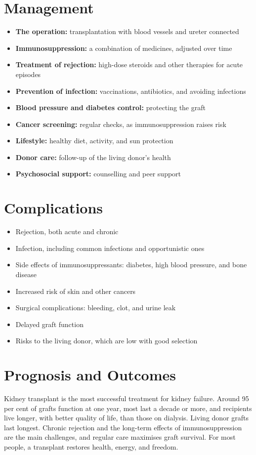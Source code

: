 \section*{Management}
\begin{itemize}
    \item \textbf{The operation:} transplantation with blood vessels and ureter connected
    \item \textbf{Immunosuppression:} a combination of medicines, adjusted over time
    \item \textbf{Treatment of rejection:} high-dose steroids and other therapies for acute episodes
    \item \textbf{Prevention of infection:} vaccinations, antibiotics, and avoiding infections
    \item \textbf{Blood pressure and diabetes control:} protecting the graft
    \item \textbf{Cancer screening:} regular checks, as immunosuppression raises risk
    \item \textbf{Lifestyle:} healthy diet, activity, and sun protection
    \item \textbf{Donor care:} follow-up of the living donor's health
    \item \textbf{Psychosocial support:} counselling and peer support
\end{itemize}

\section*{Complications}
\begin{itemize}
    \item Rejection, both acute and chronic
    \item Infection, including common infections and opportunistic ones
    \item Side effects of immunosuppressants: diabetes, high blood pressure, and bone disease
    \item Increased risk of skin and other cancers
    \item Surgical complications: bleeding, clot, and urine leak
    \item Delayed graft function
    \item Risks to the living donor, which are low with good selection
\end{itemize}

\section*{Prognosis and Outcomes}
Kidney transplant is the most successful treatment for kidney failure. Around 95 per cent of grafts function at one year, most last a decade or more, and recipients live longer, with better quality of life, than those on dialysis. Living donor grafts last longest. Chronic rejection and the long-term effects of immunosuppression are the main challenges, and regular care maximises graft survival. For most people, a transplant restores health, energy, and freedom.

